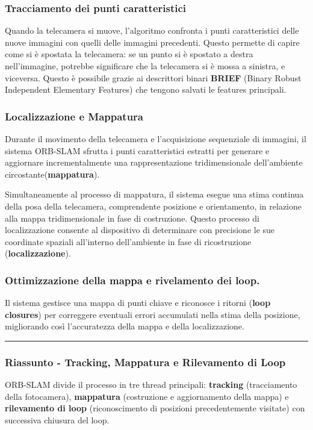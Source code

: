\documentclass[12pt,a4paper]{report}
\begin{document}
\subsubsection{Tracciamento dei punti caratteristici}

Quando la telecamera si muove, l'algoritmo confronta i punti caratteristici delle nuove immagini con quelli delle immagini precedenti. Questo permette di capire come si è spostata la telecamera: se un punto si è spostato a destra nell'immagine, potrebbe significare che la telecamera si è mossa a sinistra, e viceversa.
Questo è possibile grazie ai descrittori binari \textbf{BRIEF} (Binary Robust Independent Elementary Features) che tengono salvati le features principali.

\subsubsection{Localizzazione e Mappatura}
Durante il movimento della telecamera e l'acquisizione sequenziale di immagini, il sistema ORB-SLAM sfrutta i punti caratteristici estratti per generare e aggiornare incrementalmente una rappresentazione tridimensionale dell'ambiente circostante(\textbf{mappatura}).

Simultaneamente al processo di mappatura, il sistema esegue una stima continua della posa della telecamera, comprendente posizione e orientamento, in relazione alla mappa tridimensionale in fase di costruzione. Questo processo di localizzazione consente al dispositivo di determinare con precisione le sue coordinate spaziali all'interno dell'ambiente in fase di ricostruzione (\textbf{localizzazione}).


\subsubsection{Ottimizzazione della mappa e rivelamento dei loop.}
Il sistema gestisce una mappa di punti chiave e riconosce i ritorni (\textbf{loop closures}) per correggere eventuali errori accumulati nella stima della posizione, migliorando così l'accuratezza della mappa e della localizzazione.

\rule{\linewidth}{0.5mm}

\subsubsection{Riassunto - Tracking, Mappatura e Rilevamento di Loop}
ORB-SLAM divide il processo in tre thread principali: \textbf{tracking} (tracciamento della fotocamera), \textbf{mappatura} (costruzione e aggiornamento della mappa) e \textbf{rilevamento di loop} (riconoscimento di posizioni precedentemente visitate) con successiva chiusura del loop.
\end{document}
